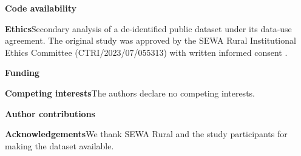 \documentclass[10pt,a4paper,twocolumn]{article}
\begin{document}
\noindent\textbf{Code availability}

\noindent\textbf{Ethics}\enspace Secondary analysis of a de-identified public dataset under its data-use agreement. The original study was approved by the SEWA Rural Institutional Ethics Committee (CTRI/2023/07/055313) with written informed consent \cite{desai2026}.

\noindent\textbf{Funding}\enspace [To be completed.]

\noindent\textbf{Competing interests}\enspace The authors declare no competing interests.

\noindent\textbf{Author contributions}\enspace [To be completed.]

\noindent\textbf{Acknowledgements}\enspace We thank SEWA Rural and the study participants for making the dataset available.
\end{document}
